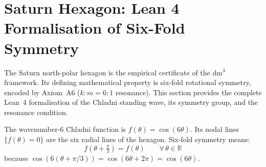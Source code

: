 \documentclass[11pt, a4paper]{article}
\theoremstyle{definition}
\begin{document}
\section{Saturn Hexagon: Lean 4 Formalisation of Six-Fold Symmetry}
\label{sec:lean-saturn}

The Saturn north-polar hexagon is the empirical certificate of the dm$^3$ framework.
Its defining mathematical property is six-fold rotational symmetry, encoded by Axiom~A6
($k{:}m = 6{:}1$ resonance). This section provides the complete Lean~4 formalisation
of the Chladni standing wave, its symmetry group, and the resonance condition.

The wavenumber-6 Chladni function is $f(\theta) = \cos(6\theta)$. Its nodal lines
$\{f(\theta)=0\}$ are the six radial lines of the hexagon. Six-fold symmetry means:
\begin{equation}
  f\!\left(\theta + \tfrac{\pi}{3}\right) = f(\theta) \qquad \forall\, \theta \in \mathbb{R}
  \label{eq:sixfold}
\end{equation}
because $\cos\!\left(6(\theta + \pi/3)\right) = \cos(6\theta + 2\pi) = \cos(6\theta)$.
\end{document}
